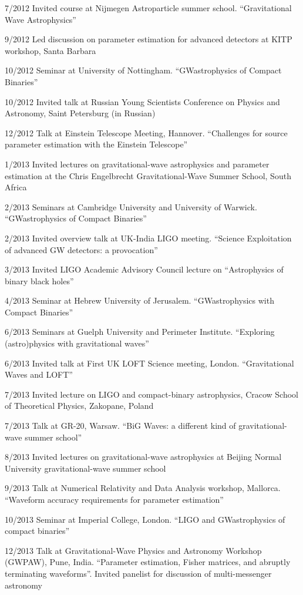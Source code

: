 \documentclass[margin,line]{res}
\begin{document}
\begin{resume}
7/2012	Invited course at Nijmegen Astroparticle summer school.  ``Gravitational Wave Astrophysics''

9/2012	Led discussion on parameter estimation for advanced detectors at KITP workshop, Santa Barbara

10/2012	Seminar at University of Nottingham.  ``GWastrophysics of Compact Binaries'' 

10/2012	Invited talk at Russian Young Scientists Conference on Physics and Astronomy, Saint Petersburg (in Russian)

12/2012	Talk at Einstein Telescope Meeting, Hannover.  ``Challenges for source parameter estimation with the Einstein Telescope''

1/2013 	Invited lectures on gravitational-wave astrophysics and parameter estimation at the Chris Engelbrecht Gravitational-Wave Summer School, South Africa

2/2013	Seminars at Cambridge University and University of Warwick.  ``GWastrophysics of Compact Binaries'' 

2/2013	Invited overview talk at UK-India LIGO meeting.  ``Science Exploitation of advanced GW detectors: a provocation''

3/2013	Invited LIGO Academic Advisory Council lecture on ``Astrophysics of binary black holes''

4/2013 	Seminar at Hebrew University of Jerusalem.  ``GWastrophysics with Compact Binaries'' 

6/2013	Seminars at Guelph University and Perimeter Institute.  ``Exploring (astro)physics with gravitational waves''

6/2013	Invited talk at First UK LOFT Science meeting, London.  ``Gravitational Waves 
and LOFT''

7/2013	Invited lecture on LIGO and compact-binary astrophysics, Cracow School of Theoretical Physics, Zakopane, Poland

7/2013	Talk at GR-20, Warsaw.  ``BiG Waves: a different kind of gravitational-wave summer school''
 
8/2013	Invited lectures on gravitational-wave astrophysics at Beijing Normal University gravitational-wave summer school
 
9/2013 	Talk at Numerical Relativity and Data Analysis workshop, Mallorca. ``Waveform accuracy requirements for parameter estimation''

10/2013 	Seminar at Imperial College, London. ``LIGO and GWastrophysics of compact binaries''

12/2013   Talk at Gravitational-Wave Physics and Astronomy Workshop (GWPAW), Pune, India.  ``Parameter estimation, Fisher matrices, and abruptly terminating waveforms''.  Invited panelist for discussion of multi-messenger astronomy


\end{resume}
\end{document}
